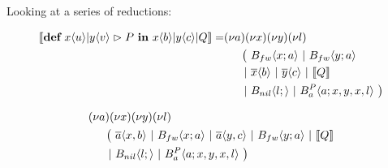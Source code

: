 
\vspace{1cm}
Looking at a series of reductions:

\begin{align*}
  \encMJtoAP{\jdef{\jrct{\jrcv{x}{u} \jpat \jrcv{y}{v}}{P}}{\jsnd{x}{b} \jpar \jsnd{y}{c} \jpar Q}}
  = &\anew{a}{\anew{x}{\anew{y}{\anew{l}{ \\
      &\hspace{0.5cm}
      \begin{aligned}[t]
        \big(\ &\ains{B_{fw}}{x}{a}
        \apar   \ains{B_{fw}}{y}{a} \\
        \apar  &\asnd{x}{b} \apar \asnd{y}{c} \apar \encMJtoAP{Q} \\
        \apar  &\ains{B_{nil}}{l}{}
        \apar   \ains{B_a^P}{a}{x, y, x, l}
        \ \big)
      \end{aligned}
    }}}}
\end{align*}


\begin{align*}
  &\anew{a}{\anew{x}{\anew{y}{\anew{l}{ \\
    &\hspace{0.5cm}
    \begin{aligned}[t]
      \big(\ &\asnd{a}{x,b}
      \apar   \ains{B_{fw}}{x}{a}
      \apar   \asnd{a}{y,c}
      \apar   \ains{B_{fw}}{y}{a}
      \apar   \encMJtoAP{Q} \\
      \apar  &\ains{B_{nil}}{l}{}
      \apar   \ains{B_a^P}{a}{x, y, x, l}
      \ \big)
    \end{aligned}
  }}}}
\end{align*}


